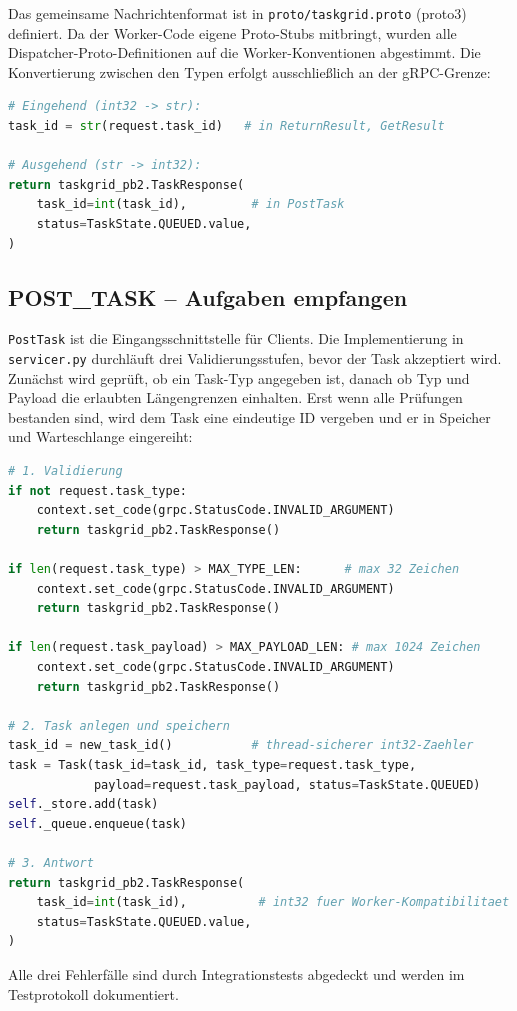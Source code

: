 Das gemeinsame Nachrichtenformat ist in \texttt{proto/taskgrid.proto}
(proto3) definiert. Da der Worker-Code eigene Proto-Stubs mitbringt,
wurden alle Dispatcher-Proto-Definitionen auf die Worker-Konventionen abgestimmt.
Die Konvertierung zwischen den Typen erfolgt ausschließlich an der gRPC-Grenze:
\newpage
\begin{lstlisting}[language=Python,caption={int32-Konvertierung an der gRPC-Grenze}]
# Eingehend (int32 -> str):
task_id = str(request.task_id)   # in ReturnResult, GetResult

# Ausgehend (str -> int32):
return taskgrid_pb2.TaskResponse(
    task_id=int(task_id),         # in PostTask
    status=TaskState.QUEUED.value,
)
\end{lstlisting}

\subsection{POST\_TASK -- Aufgaben empfangen}
\label{sec:post-task}

\texttt{PostTask} ist die Eingangsschnittstelle für Clients.
Die Implementierung in \texttt{servicer.py} durchläuft drei Validierungsstufen,
bevor der Task akzeptiert wird. Zunächst wird geprüft, ob ein Task-Typ angegeben
ist, danach ob Typ und Payload die erlaubten Längengrenzen einhalten. Erst wenn
alle Prüfungen bestanden sind, wird dem Task eine eindeutige ID vergeben und er
in Speicher und Warteschlange eingereiht:

\begin{lstlisting}[language=Python,caption={PostTask -- Validierung und Einreihung}]
# 1. Validierung
if not request.task_type:
    context.set_code(grpc.StatusCode.INVALID_ARGUMENT)
    return taskgrid_pb2.TaskResponse()

if len(request.task_type) > MAX_TYPE_LEN:      # max 32 Zeichen
    context.set_code(grpc.StatusCode.INVALID_ARGUMENT)
    return taskgrid_pb2.TaskResponse()

if len(request.task_payload) > MAX_PAYLOAD_LEN: # max 1024 Zeichen
    context.set_code(grpc.StatusCode.INVALID_ARGUMENT)
    return taskgrid_pb2.TaskResponse()

# 2. Task anlegen und speichern
task_id = new_task_id()           # thread-sicherer int32-Zaehler
task = Task(task_id=task_id, task_type=request.task_type,
            payload=request.task_payload, status=TaskState.QUEUED)
self._store.add(task)
self._queue.enqueue(task)

# 3. Antwort
return taskgrid_pb2.TaskResponse(
    task_id=int(task_id),          # int32 fuer Worker-Kompatibilitaet
    status=TaskState.QUEUED.value,
)
\end{lstlisting}
Alle drei Fehlerfälle sind durch Integrationstests abgedeckt und werden im
Testprotokoll dokumentiert.

